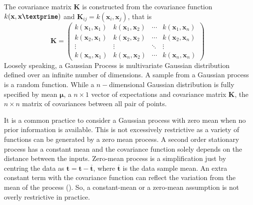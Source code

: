 The covariance matrix $\textbf{K}$ is constructed from the covariance function $k(\textbf{x},\textbf{x\textprime})$ and $\textbf{K}_{ij}=k\left(\textbf{x}_i,\textbf{x}_j\right)$, that is 
\begin{equation} \label{eq:GP_cov_mat}
\textbf{K} = 
 \begin{pmatrix}
  k\left(\textbf{x}_1,\textbf{x}_1\right) & k\left(\textbf{x}_1,\textbf{x}_2\right) & \cdots & k\left(\textbf{x}_1,\textbf{x}_n\right) \\
  k\left(\textbf{x}_2,\textbf{x}_1\right) & k\left(\textbf{x}_2,\textbf{x}_2\right) & \cdots & k\left(\textbf{x}_2,\textbf{x}_n\right) \\
  \vdots  & \vdots  & \ddots & \vdots  \\
  k\left(\textbf{x}_n,\textbf{x}_1\right) & k\left(\textbf{x}_n,\textbf{x}_2\right) & \cdots & k\left(\textbf{x}_n,\textbf{x}_n\right)
 \end{pmatrix}
\end{equation}
Loosely speaking, a Gaussian Process is multivariate Gaussian distribution defined over an infinite number of dimensions. A sample from a Gaussian process is a random function. While a $n-$dimensional Gaussian distribution is fully specified by mean $\boldsymbol\mu$, a $n \times 1$ vector of expectations and covariance matrix $\textbf{K}$, the $n \times n$ matrix of covariances between all pair of points.

It is a common practice to consider a Gaussian process with zero mean when no prior information is available. This is not excessively restrictive as a variety of functions can be generated by a zero mean process. A second order stationary process has a constant mean and the covariance function solely depends on the distance between the inputs. Zero-mean process is a simplification just by centring the data as $\textbf{t} = \textbf{t} - \overline{\textbf{t}}$, where $\overline{\textbf{t}}$ is the data sample mean. An extra constant term with the covariance function can reflect the variation from the mean of the process (\cite{MacKay:2003}). So, a constant-mean or a zero-mean assumption is not overly restrictive in practice.

